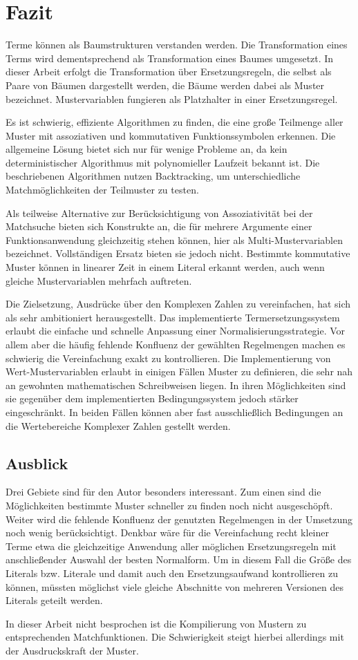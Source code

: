 

\chapter{Fazit} \label{secZusammenfassung}
Terme können als Baumstrukturen verstanden werden. Die Transformation eines Terms wird dementsprechend als Transformation eines Baumes umgesetzt. In dieser Arbeit erfolgt die Transformation über Ersetzungsregeln, die selbst als Paare von Bäumen dargestellt werden, die Bäume werden dabei als Muster bezeichnet. Mustervariablen fungieren als Platzhalter in einer Ersetzungsregel.

Es ist schwierig, effiziente Algorithmen zu finden, die eine große Teilmenge aller Muster mit assoziativen und kommutativen Funktionssymbolen erkennen. Die allgemeine Lösung bietet sich nur für wenige Probleme an, da kein deterministischer Algorithmus mit polynomieller Laufzeit bekannt ist. 
Die beschriebenen Algorithmen nutzen Backtracking, um unterschiedliche Matchmöglichkeiten der Teilmuster zu testen. 

Als teilweise Alternative zur Berücksichtigung von Assoziativität bei der Matchsuche bieten sich Konstrukte an, die für mehrere Argumente einer Funktionsanwendung gleichzeitig stehen können, hier als Multi-Mustervariablen bezeichnet. Vollständigen Ersatz bieten sie jedoch nicht.
Bestimmte kommutative Muster können in linearer Zeit in einem Literal erkannt werden, auch wenn gleiche Mustervariablen mehrfach auftreten. 

Die Zielsetzung, Ausdrücke über den Komplexen Zahlen zu vereinfachen, hat sich als sehr ambitioniert herausgestellt. Das implementierte Termersetzungssystem erlaubt die einfache und schnelle Anpassung einer Normalisierungsstrategie. Vor allem aber die häufig fehlende Konfluenz der gewählten Regelmengen machen es schwierig die Vereinfachung exakt zu kontrollieren. 
Die Implementierung von Wert-Mustervariablen erlaubt in einigen Fällen Muster zu definieren, die sehr nah an gewohnten mathematischen Schreibweisen liegen. In ihren Möglichkeiten sind sie gegenüber dem implementierten Bedingungssystem jedoch stärker eingeschränkt. In beiden Fällen können aber fast ausschließlich Bedingungen an die Wertebereiche Komplexer Zahlen gestellt werden.

\section{Ausblick}
Drei Gebiete sind für den Autor besonders interessant. Zum einen sind die Möglichkeiten bestimmte Muster schneller zu finden noch nicht ausgeschöpft. Weiter wird die fehlende Konfluenz der genutzten Regelmengen in der Umsetzung noch wenig berücksichtigt. Denkbar wäre für die Vereinfachung recht kleiner Terme etwa die gleichzeitige Anwendung aller möglichen Ersetzungsregeln mit anschließender Auswahl der besten Normalform. Um in diesem Fall die Größe des Literals bzw. Literale und damit auch den Ersetzungsaufwand kontrollieren zu können, müssten möglichst viele gleiche Abschnitte von mehreren Versionen des Literals geteilt werden. 

In dieser Arbeit nicht besprochen ist die Kompilierung von Mustern zu entsprechenden Matchfunktionen. Die Schwierigkeit steigt hierbei allerdings mit der Ausdruckskraft der Muster.






